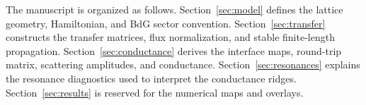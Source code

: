 The manuscript is organized as follows.  Section~\ref{sec:model} defines the lattice geometry, Hamiltonian, and BdG sector convention.  Section~\ref{sec:transfer} constructs the transfer matrices, flux normalization, and stable finite-length propagation.  Section~\ref{sec:conductance} derives the interface maps, round-trip matrix, scattering amplitudes, and conductance.  Section~\ref{sec:resonances} explains the resonance diagnostics used to interpret the conductance ridges.  Section~\ref{sec:results} is reserved for the numerical maps and overlays.
